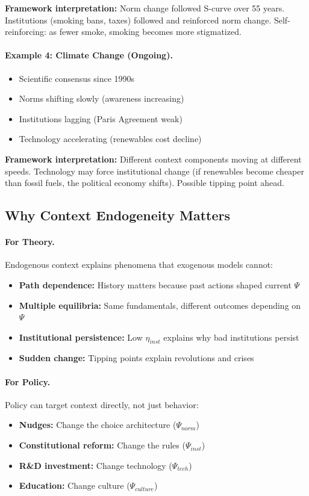\documentclass[12pt,a4paper]{article}
\begin{document}
\textbf{Framework interpretation:}
Norm change followed S-curve over 55 years.
Institutions (smoking bans, taxes) followed and reinforced norm change.
Self-reinforcing: as fewer smoke, smoking becomes more stigmatized.

\paragraph{Example 4: Climate Change (Ongoing).}
\begin{itemize}
  \item Scientific consensus since 1990s
  \item Norms shifting slowly (awareness increasing)
  \item Institutions lagging (Paris Agreement weak)
  \item Technology accelerating (renewables cost decline)
\end{itemize}

\textbf{Framework interpretation:}
Different context components moving at different speeds.
Technology may force institutional change (if renewables become cheaper than fossil fuels,
the political economy shifts).
Possible tipping point ahead.

\subsection{Why Context Endogeneity Matters}

\paragraph{For Theory.}
Endogenous context explains phenomena that exogenous models cannot:
\begin{itemize}
  \item \textbf{Path dependence:} History matters because past actions shaped current $\Psi$
  \item \textbf{Multiple equilibria:} Same fundamentals, different outcomes depending on $\Psi$
  \item \textbf{Institutional persistence:} Low $\eta_{inst}$ explains why bad institutions persist
  \item \textbf{Sudden change:} Tipping points explain revolutions and crises
\end{itemize}

\paragraph{For Policy.}
Policy can target context directly, not just behavior:
\begin{itemize}
  \item \textbf{Nudges:} Change the choice architecture ($\Psi_{norm}$)
  \item \textbf{Constitutional reform:} Change the rules ($\Psi_{inst}$)
  \item \textbf{R\&D investment:} Change technology ($\Psi_{tech}$)
  \item \textbf{Education:} Change culture ($\Psi_{culture}$)
\end{itemize}
\end{document}
